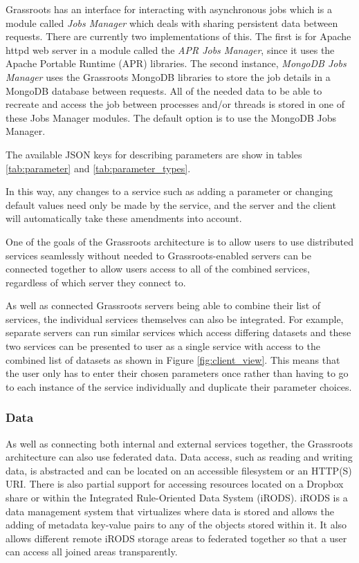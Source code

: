 \documentclass[12pt,a4paper]{extarticle}
\begin{document}
Grassroots has an interface for interacting with asynchronous jobs which is a module called \textit{Jobs Manager} which deals with sharing persistent data between requests. 
There are currently two implementations of this. The first is for Apache httpd web server in a module called the \textit{APR Jobs Manager}, since it uses the Apache Portable Runtime (APR) libraries. 
The second instance, \textit{MongoDB Jobs Manager} uses the Grassroots MongoDB libraries to store the job details in a MongoDB database between requests.
All of the needed data to be able to recreate and access the job between processes and/or threads is stored in one of these Jobs Manager modules. 
The default option is to use the MongoDB Jobs Manager.

The available JSON keys for describing parameters are show in tables \ref{tab:parameter} and \ref{tab:parameter_types}.


In this way, any changes to a service such as adding a parameter or changing default values need only be made by the service, and the server and the client will automatically take these amendments into account.

One of the goals of the Grassroots architecture is to allow users to use distributed services seamlessly without needed to 
Grassroots-enabled servers can be connected together to allow users access to all of the combined services, regardless of which server they connect to. 

As well as connected Grassroots servers being able to combine their list of services, the individual services themselves can also be integrated. 
For example, separate servers can run similar services which access differing datasets and these two services can be presented to user as a single service with access to the combined list of datasets as shown in Figure \ref{fig:client_view}. 
This means that the user only has to enter their chosen parameters once rather than having to go to each instance of the service individually and duplicate their parameter choices. 

\subsubsection*{Data}

As well as connecting both internal and external services together, the Grassroots architecture can also use federated data. Data access, such as reading and writing data, is abstracted and can be located on an accessible filesystem or an HTTP(S) URI. 
There is also partial support for accessing resources located on a Dropbox\cite{Dropbox} share or within the Integrated Rule-Oriented Data System (iRODS)\cite{2007AGUFMIN13B1214R}. iRODS is a data management system that virtualizes where data is stored and allows the adding of metadata key-value pairs to any of the objects stored within it. It also allows different remote iRODS storage areas to federated together so that a user can access all joined areas transparently.
\end{document}
